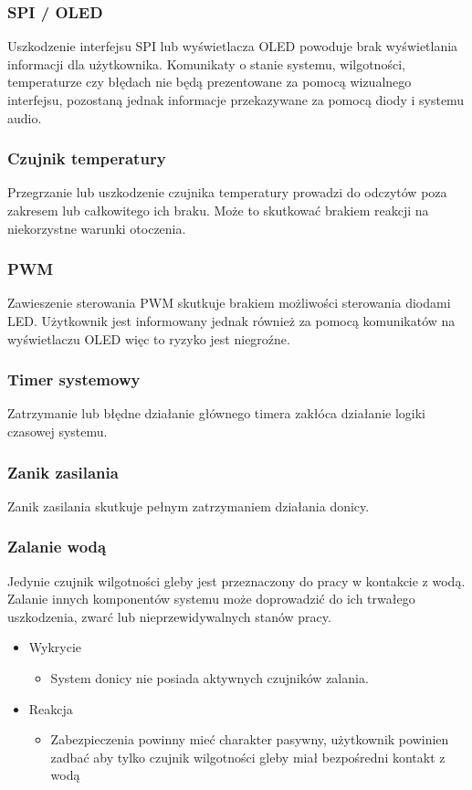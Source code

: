 \documentclass{article}
\begin{document}
\subsubsection{SPI / OLED}
Uszkodzenie interfejsu SPI lub wyświetlacza OLED powoduje brak wyświetlania informacji dla użytkownika. Komunikaty o stanie systemu, wilgotności, temperaturze czy błędach nie będą prezentowane za pomocą wizualnego interfejsu, pozostaną jednak informacje przekazywane za pomocą diody i systemu audio.

\subsubsection{Czujnik temperatury}
Przegrzanie lub uszkodzenie czujnika temperatury prowadzi do odczytów poza zakresem lub całkowitego ich braku. Może to skutkować brakiem reakcji na niekorzystne warunki otoczenia.

\subsubsection{PWM}
Zawieszenie sterowania PWM skutkuje brakiem możliwości sterowania diodami LED. Użytkownik jest informowany jednak również za pomocą komunikatów na wyświetlaczu OLED więc to ryzyko jest niegroźne.

\subsubsection{Timer systemowy}
Zatrzymanie lub błędne działanie głównego timera zakłóca działanie logiki czasowej systemu. 

\subsubsection{Zanik zasilania}
Zanik zasilania skutkuje pełnym zatrzymaniem działania donicy.

\subsubsection{Zalanie wodą}
Jedynie czujnik wilgotności gleby jest przeznaczony do pracy w kontakcie z wodą. Zalanie innych komponentów systemu może doprowadzić do ich trwałego uszkodzenia, zwarć lub nieprzewidywalnych stanów pracy.

\begin{itemize}
    \item Wykrycie
    \begin{itemize}
        \item System donicy nie posiada aktywnych czujników zalania.
    \end{itemize}
    \item Reakcja
    \begin{itemize}
        \item Zabezpieczenia powinny mieć charakter pasywny, użytkownik powinien zadbać aby tylko czujnik wilgotności gleby miał bezpośredni kontakt z wodą
    \end{itemize}
\end{itemize}
\end{document}
